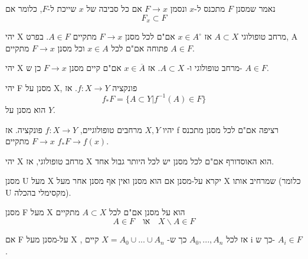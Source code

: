 \documentclass{tstextbook}
\begin{document}
\begin{definition}
נאמר שמסנן \(F\) מתכנס ל-\(x\) ונסמן \(F\rightarrow x\) אם כל סביבה של \(x\) שייכת ל-\(F\), כלומר אם
$$F_{x}\subset F$$

\end{definition}
\begin{proposition}
יהי X מרחב טופולוגי \(A\subset X\) אז \(x\in A^{\circ}\) אם"ם לכל מסנן \(F\rightarrow x\) מתקיים \(A\in F\). בפרט, A פתוחה אם"ם לכל \(x\in A\) וכל מסנן \(F\rightarrow x\) מתקיים \(A\in F\).

\end{proposition}
\begin{proposition}
יהי X מרחב טופולוגי ו- \(A\subset X\). אז \(x\in \overline{A}\) אם"ם קיים מסנן \(F\rightarrow x\) כן ש- \(A\in F\).

\end{proposition}
\begin{definition}
יהי F מסנן על X, פונקציה \(f:X\rightarrow Y\). אז
$$f_{*}F=\{A\subset Y|f^{-1}(A)\in F\}$$
הוא מסנן על \(Y\).

\end{definition}
\begin{proposition}
יהיו \(X,Y\) מרחבים טופולוגיים, \(f:X\rightarrow Y\) פונקציה. אז f רציפה אם"ם לכל מסנן מתכנס \(F\rightarrow x\) מתקיים \(f_{*}F\rightarrow f(x)\).

\end{proposition}
\begin{proposition}
יהי X מרחב טופולוגי, אז X הוא האוסדורף אם"ם לכל מסנן יש לכל היותר גבול אחד.

\end{proposition}
\begin{definition}[על-מסנן]
מסנן U מעל X יקרא על-מסנן אם הוא מסנן ואין אף מסנן אחר מעל X שמרחיב אותו (כלומר U מקסימלי בהכלה).

\end{definition}
\begin{proposition}
מסנן F מעל X הוא על מסנן אם"ם לכל \(A\subset X\) מתקיים
$$A\in F \quad \text{או} \quad X\backslash A\in F$$

\end{proposition}
\begin{proposition}
אם F על-מסנן מעל X , אז לכל \(A_{0},...,A_{n}\) כך ש- \(X=A_{0}\cup...\cup A_{n}\) קיים i כך ש- \(A_{i}\in F\).

\end{proposition}
\end{document}
